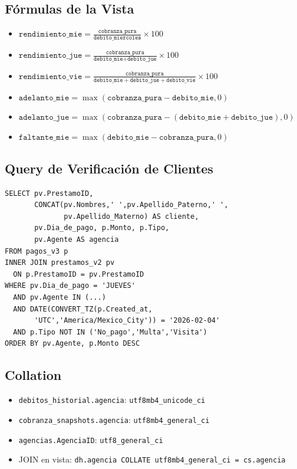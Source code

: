 \documentclass[11pt,a4paper]{article}
\begin{document}
\subsection{F\'ormulas de la Vista}

\begin{itemize}[leftmargin=2em]
  \item $\texttt{rendimiento\_mie} = \frac{\texttt{cobranza\_pura}}{\texttt{debito\_miercoles}} \times 100$
  \item $\texttt{rendimiento\_jue} = \frac{\texttt{cobranza\_pura}}{\texttt{debito\_mie} + \texttt{debito\_jue}} \times 100$
  \item $\texttt{rendimiento\_vie} = \frac{\texttt{cobranza\_pura}}{\texttt{debito\_mie} + \texttt{debito\_jue} + \texttt{debito\_vie}} \times 100$
  \item $\texttt{adelanto\_mie} = \max(\texttt{cobranza\_pura} - \texttt{debito\_mie}, 0)$
  \item $\texttt{adelanto\_jue} = \max(\texttt{cobranza\_pura} - (\texttt{debito\_mie} + \texttt{debito\_jue}), 0)$
  \item $\texttt{faltante\_mie} = \max(\texttt{debito\_mie} - \texttt{cobranza\_pura}, 0)$
\end{itemize}

\subsection{Query de Verificaci\'on de Clientes}

\begin{verbatim}
SELECT pv.PrestamoID,
       CONCAT(pv.Nombres,' ',pv.Apellido_Paterno,' ',
              pv.Apellido_Materno) AS cliente,
       pv.Dia_de_pago, p.Monto, p.Tipo,
       pv.Agente AS agencia
FROM pagos_v3 p
INNER JOIN prestamos_v2 pv
  ON p.PrestamoID = pv.PrestamoID
WHERE pv.Dia_de_pago = 'JUEVES'
  AND pv.Agente IN (...)
  AND DATE(CONVERT_TZ(p.Created_at,
       'UTC','America/Mexico_City')) = '2026-02-04'
  AND p.Tipo NOT IN ('No_pago','Multa','Visita')
ORDER BY pv.Agente, p.Monto DESC
\end{verbatim}

\subsection{Collation}

\begin{itemize}[leftmargin=2em]
  \item \texttt{debitos\_historial.agencia}: \texttt{utf8mb4\_unicode\_ci}
  \item \texttt{cobranza\_snapshots.agencia}: \texttt{utf8mb4\_general\_ci}
  \item \texttt{agencias.AgenciaID}: \texttt{utf8\_general\_ci}
  \item JOIN en vista: \texttt{dh.agencia COLLATE utf8mb4\_general\_ci = cs.agencia}
\end{itemize}
\end{document}
